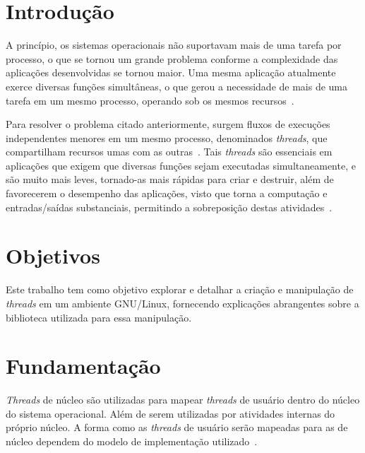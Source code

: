 \documentclass[
	12pt,				%
	oneside,   	        %
	a4paper,			%
	english,			%
	french,				%
	spanish,			%
	brazil,				%
	]{pacotes/abntex2}
\begin{document}
\textual

\makeatletter
\renewcommand{\chapter}{\@gobbletwo}
\makeatother

\section{Introdução}
\label{sec:introducao}
A princípio, os sistemas operacionais não suportavam mais de uma tarefa por processo, o que se tornou um grande problema conforme a complexidade das aplicações desenvolvidas se tornou maior. Uma mesma aplicação atualmente exerce diversas funções simultâneas, o que gerou a necessidade de mais de uma tarefa em um mesmo processo, operando sob os mesmos recursos~\cite{maziero2019}.

Para resolver o problema citado anteriormente, surgem fluxos de execuções independentes menores em um mesmo processo, denominados \textit{threads}, que compartilham recursos umas com as outras~\cite{maziero2019}. Tais \textit{threads} são essenciais em aplicações que exigem que diversas funções sejam executadas simultaneamente, e são muito mais leves, tornado-as mais rápidas para criar e destruir, além de favorecerem o desempenho das aplicações, visto que torna a computação e entradas/saídas substanciais, permitindo a sobreposição destas atividades~\cite{tanenbaum2016}. 

\section{Objetivos}
\label{sec:objetivos}

Este trabalho tem como objetivo explorar e detalhar a criação e manipulação de \textit{threads} em um ambiente GNU/Linux, fornecendo explicações abrangentes sobre a biblioteca utilizada para essa manipulação.

\section{Fundamentação}
\label{sec:fundamentacao}
\textit{Threads} de núcleo são utilizadas para mapear \textit{threads} de usuário dentro do núcleo do sistema operacional. Além de serem utilizadas por atividades internas do próprio núcleo. A forma como as \textit{threads} de usuário serão mapeadas para as de núcleo dependem do modelo de implementação utilizado~\cite{maziero2019}.
\end{document}
